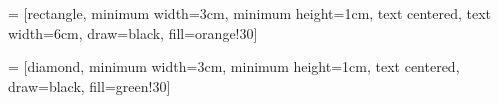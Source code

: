  = [rectangle, minimum width=3cm, minimum height=1cm, text centered, text width=6cm, draw=black, fill=orange!30]

 = [diamond, minimum width=3cm, minimum height=1cm, text centered, draw=black, fill=green!30]






\begin{comment}

    \begin{center} \begin{tikzpicture}[ baseline=0, node distance=1.5cm]
        \node (start) [flowchart-start] {P - Q};
        \node (S1) [flowchart-process, below of=start] { Q1 = 1's complement of Q };
        \node (S2) [flowchart-process, below of=S1] { R = P + Q1 };
        \node (S3) [flowchart-decision, below of=S2, yshift=-0.5cm] { Carry? };xx
        \node (S4) [flowchart-start, below left=2cm of S3] { Result = R + carry};
        \node (S5) [flowchart-start, below right=2cm of S3] {Result = R1};

        \draw [flowchart-arrow] (start) -- (S1); \draw [flowchart-arrow] (S1) -- (S2); \draw [flowchart-arrow] (S2) -- (S3);
        \draw [flowchart-arrow] (S3.west) -| node[right of= S3, xshift=-1cm, yshift=0.2cm] {Yes} (S4.north);
        \draw [flowchart-arrow] (S3.east) -| node[right of= S3, xshift=-3cm, yshift=0.2cm] {No} (S5.north);

    \end{tikzpicture} \end{center}


    \begin{center} \begin{tikzpicture}[ baseline=0]
    \matrix [draw=white,column sep=0cm]
    {
        \node[draw=black!60] {8}; & \node[draw=black!60]{1}; & \node[draw=black!60] {6}; \\
        \node[draw=blue!60] {8}; & \node[draw=blue!60]{1}; & \node[draw=blue!60] {6}; \\
    };
    \end{tikzpicture} \end{center}


\end{comment}

